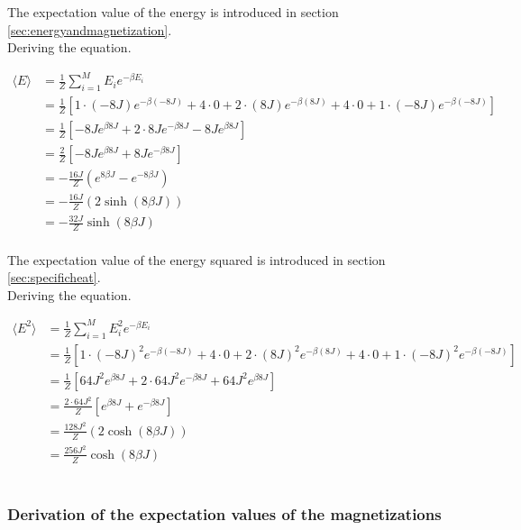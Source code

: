 \documentclass{article}
\begin{document}
The expectation value of the energy is introduced in section \ref{sec:energyandmagnetization}. \\

Deriving the equation.

\begin{align*}
  \langle E \rangle &= \frac{1}{Z} \sum _{i=1} ^M E_i e^{- \beta E_i} \\
  &= \frac{1}{Z} \left[ 1 \cdot (-8J) e^{- \beta (-8J)} + 4 \cdot 0 + 2 \cdot (8J) e^{- \beta (8J)} + 4 \cdot 0 + 1 \cdot (-8J) e^{- \beta (-8J)} \right] \\
  &= \frac{1}{Z} \left[ - 8J e^{\beta 8J} + 2 \cdot 8J e^{- \beta 8J} - 8J e^{ \beta 8J} \right] \\
  &= \frac{2}{Z} \left[ - 8J e^{\beta 8 J} + 8 J e^{- \beta 8 J} \right] \\
  &= - \frac{16 J}{Z} \left( e^{8 \beta J} - e^{- 8 \beta J} \right) \\
  &= - \frac{16 J}{Z} (2 \sinh(8 \beta J) ) \\
  &= - \frac{32 J}{Z} \sinh(8 \beta J)
\end{align*} \\

The expectation value of the energy squared is introduced in section \ref{sec:specificheat}. \\

Deriving the equation.

\begin{align*}
  \langle E^2 \rangle &= \frac{1}{Z} \sum _{i=1} ^M E_i^2 e^{- \beta E_i} \\
  &= \frac{1}{Z} \left[ 1 \cdot (-8J)^2 e^{- \beta (-8J)} + 4 \cdot 0 + 2 \cdot (8J)^2 e^{- \beta (8J)} + 4 \cdot 0 + 1 \cdot (-8J)^2 e^{- \beta (-8J)} \right] \\
  &= \frac{1}{Z} \left[ 64 J^2 e^{\beta 8J} + 2 \cdot 64 J^2 e^{- \beta 8J} + 64 J^2 e^{ \beta 8J} \right] \\
  &= \frac{2 \cdot 64 J^2}{Z} \left[ e^{\beta 8 J} + e^{- \beta 8 J} \right] \\
  &= \frac{128 J^2}{Z} (2 \cosh(8 \beta J) ) \\
  &= \frac{256 J^2}{Z} \cosh(8 \beta J)
\end{align*} \\


\subsubsection{Derivation of the expectation values of the magnetizations} \label{sec:derivationmagnetizations}
\end{document}
